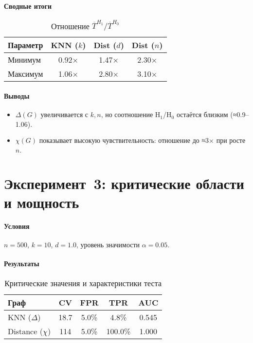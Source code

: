 \documentclass[12pt,a4paper]{article}
\begin{document}
\paragraph{Сводные итоги}
\begin{table}[ht]
\centering
\caption{Отношение $\overline{T}^{H_1}/\overline{T}^{H_0}$}
\begin{tabular}{lccc}
\toprule
Параметр       & KNN ($k$) & Dist ($d$)      & Dist ($n$)       \\
\midrule
Минимум        & 0.92×     & 1.47×            & 2.30×            \\
Максимум       & 1.06×     & 2.80×            & 3.10×            \\
\bottomrule
\end{tabular}
\end{table}

\paragraph{Выводы}
\begin{itemize}
  \item $\Delta(G)$ увеличивается с $k,n$, но соотношение H$_1$/H$_0$ остаётся близким (≈0.9–1.06).
  \item $\chi(G)$ показывает высокую чувствительность: отношение до ≈3× при росте $n$.
\end{itemize}

\section{Эксперимент 3: критические области и мощность}
\paragraph{Условия} $n=500$, $k=10$, $d=1.0$, уровень значимости $\alpha=0.05$.

\paragraph{Результаты}
\begin{table}[ht]
\centering
\caption{Критические значения и характеристики теста}
\begin{tabular}{lcccc}
\toprule
Граф               & CV    & FPR   & TPR      & AUC   \\
\midrule
KNN ($\Delta$)     & 18.7  & 5.0\% & 4.8\%    & 0.545 \\
Distance ($\chi$)  & 114   & 5.0\% & 100.0\%  & 1.000 \\
\bottomrule
\end{tabular}
\end{table}
\end{document}

